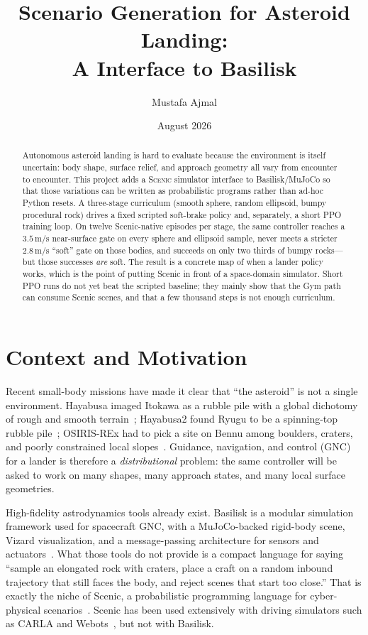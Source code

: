 \documentclass[10pt]{article}
\title{Scenario Generation for Asteroid Landing:\\
A \Scenic{} Interface to Basilisk}
\author{Mustafa Ajmal}
\date{August 2026}
\newcommand{\Scenic}{\textsc{Scenic}}
\begin{document}
\maketitle

\begin{abstract}
Autonomous asteroid landing is hard to evaluate because the environment is itself uncertain: body shape, surface relief, and approach geometry all vary from encounter to encounter.
This project adds a \Scenic{} simulator interface to Basilisk/MuJoCo so that those variations can be written as probabilistic programs rather than ad-hoc Python resets.
A three-stage curriculum (smooth sphere, random ellipsoid, bumpy procedural rock) drives a fixed scripted soft-brake policy and, separately, a short PPO training loop.
On twelve Scenic-native episodes per stage, the same controller reaches a $3.5\,\mathrm{m/s}$ near-surface gate on every sphere and ellipsoid sample, never meets a stricter $2.8\,\mathrm{m/s}$ ``soft'' gate on those bodies, and succeeds on only two thirds of bumpy rocks---but those successes \emph{are} soft.
The result is a concrete map of when a lander policy works, which is the point of putting Scenic in front of a space-domain simulator.
Short PPO runs do not yet beat the scripted baseline; they mainly show that the Gym path can consume Scenic scenes, and that a few thousand steps is not enough curriculum.
\end{abstract}

\section{Context and Motivation}
\label{sec:intro}

Recent small-body missions have made it clear that ``the asteroid'' is not a single environment.
Hayabusa imaged Itokawa as a rubble pile with a global dichotomy of rough and smooth terrain~\citep{fujiwara2006itokawa}; Hayabusa2 found Ryugu to be a spinning-top rubble pile~\citep{watanabe2019ryugu}; OSIRIS-REx had to pick a site on Bennu among boulders, craters, and poorly constrained local slopes~\citep{lauretta2017osiris}.
Guidance, navigation, and control (GNC) for a lander is therefore a \emph{distributional} problem: the same controller will be asked to work on many shapes, many approach states, and many local surface geometries.

High-fidelity astrodynamics tools already exist.
Basilisk is a modular simulation framework used for spacecraft GNC, with a MuJoCo-backed rigid-body scene, Vizard visualization, and a message-passing architecture for sensors and actuators~\citep{kenneally2020basilisk,basiliskdocs,todorov2012mujoco}.
What those tools do not provide is a compact language for saying ``sample an elongated rock with craters, place a craft on a random inbound trajectory that still faces the body, and reject scenes that start too close.''
That is exactly the niche of Scenic, a probabilistic programming language for cyber-physical scenarios~\citep{fremont2019scenic,fremont2022scenic,vin2023scenic3}.
Scenic has been used extensively with driving simulators such as CARLA and Webots~\citep{dosovitskiy2017carla,michel2004webots,scenicdocs}, but not with Basilisk.
\end{document}
